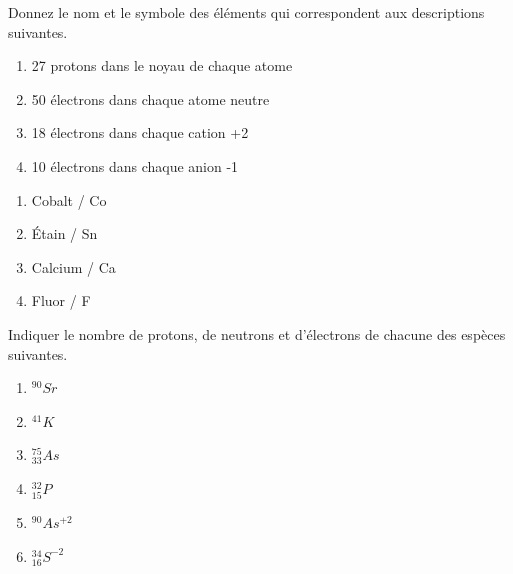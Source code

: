 \documentclass[
  11pt,
  french,
  a4paper,
  openany]{book}
\providecommand{\tightlist}{%
  \setlength{\itemsep}{0pt}\setlength{\parskip}{0pt}}
\begin{document}
\newpage

\begin{Exercise}

Donnez le nom et le symbole des éléments qui correspondent aux descriptions suivantes.

\begin{enumerate}
\def\labelenumi{\arabic{enumi}.}
\tightlist
\item
  27 protons dans le noyau de chaque atome\\
\item
  50 électrons dans chaque atome neutre\\
\item
  18 électrons dans chaque cation +2\\
\item
  10 électrons dans chaque anion -1
\end{enumerate}


\end{Exercise}

\begin{Answer}

\begin{enumerate}
\def\labelenumi{\arabic{enumi}.}
\tightlist
\item
  Cobalt / Co
\item
  Étain / Sn
\item
  Calcium / Ca
\item
  Fluor / F
\end{enumerate}


\end{Answer}

\begin{Exercise}

Indiquer le nombre de protons, de neutrons et d'électrons de chacune des espèces suivantes.

\begin{enumerate}
\def\labelenumi{\arabic{enumi}.}
\tightlist
\item
  \(^{90}Sr\)\\
\item
  \(^{41}K\)\\
\item
  \(^{75}_{33}As\)\\
\item
  \(^{32}_{15}P\)\\
\item
  \(^{90}As^{+2}\)\\
\item
  \(^{34}_{16}S^{-2}\)
\end{enumerate}


\end{Exercise}
\end{document}
